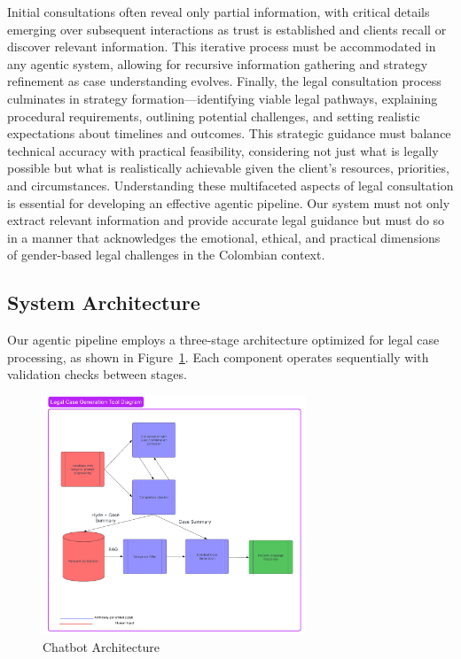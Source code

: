 Initial consultations often reveal only partial information, with critical details emerging over 
subsequent interactions as trust is established and clients recall or discover relevant information. 
This iterative process must be accommodated in any agentic system, allowing for recursive 
information gathering and strategy refinement as case understanding evolves.
Finally, the legal consultation process culminates in strategy formation—identifying viable 
legal pathways, explaining procedural requirements, outlining potential challenges, and setting 
realistic expectations about timelines and outcomes. This strategic guidance must balance 
technical accuracy with practical feasibility, considering not just what is legally possible 
but what is realistically achievable given the client's resources, priorities, and circumstances.
Understanding these multifaceted aspects of legal consultation is essential for developing an 
effective agentic pipeline. Our system must not only extract relevant information and provide 
accurate legal guidance but must do so in a manner that acknowledges the emotional, ethical, 
and practical dimensions of gender-based legal challenges in the Colombian context.

\subsection{System Architecture}
\label{sec:architecture}

Our agentic pipeline employs a three-stage architecture optimized for legal case processing, 
as shown in Figure~\ref{fig:chatbot_architecture}. 
Each component operates sequentially with validation checks between stages.

\begin{figure}[htbp]
    \centering
    \includegraphics[width=0.7\textwidth]{figures/Chatbot_arch.png}
    \caption{Chatbot Architecture}
    \label{fig:chatbot_architecture}
\end{figure}

